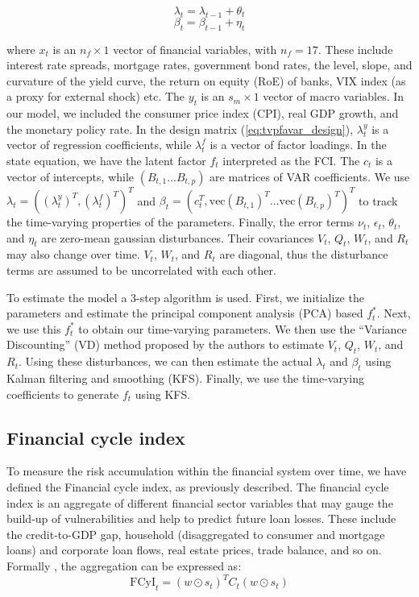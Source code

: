\documentclass[12pt,a4paper]{article}
\begin{document}
\begin{equation}
    \label{eq:tvpfavar_design_coeff}
    \lambda_t = \lambda_{t-1} + \theta_t
\end{equation}
\begin{equation}
    \label{eq:tvpfavar_transition_coeff}
    \beta_t = \beta_{t-1} + \eta_t
\end{equation}

where $x_t$ is an $n_f\times1$ vector of financial variables, with $n_f=17$. These include interest rate spreads, mortgage rates, government bond rates, the level, slope, and curvature of the yield curve, the return on equity (RoE) of banks, VIX index (as a proxy for external shock) etc. The $y_t$ is an $s_m\times1$ vector of macro variables. In our model, we included the consumer price index (CPI), real GDP growth, and the monetary policy rate. In the design matrix (\autoref{eq:tvpfavar_design}), $\lambda_t^y$ is a vector of regression coefficients, while $\lambda_t^f$ is a vector of factor loadings. In the state equation, we have the latent factor $f_t$ interpreted as the FCI. The $c_t$ is a vector of intercepts, while $(B_{t,1} \dots B_{t,p})$ are matrices of VAR coefficients. We use $\lambda_t=\left((\lambda_t^y)^T,(\lambda_t^f)^T \right)^T$ and $\beta_t=\left(c_t^T,\text{vec}(B_{t,1})^T \dots \text{vec}(B_{t,p})^T\right)^T$ to track the time-varying properties of the parameters. Finally, the error terms $\nu_t$, $\epsilon_t$, $\theta_t$, and $\eta_t$ are zero-mean gaussian disturbances. Their covariances $V_t$, $Q_t$, $W_t$, and $R_t$ may also change over time. $V_t$, $W_t$, and $R_t$ are diagonal, thus the disturbance terms are assumed to be uncorrelated with each other.

To estimate the model a 3-step algorithm is used. First, we initialize the parameters and estimate the principal component analysis (PCA) based $f_t^*$. Next, we use this $f_t^*$ to obtain our time-varying parameters. We then use the ``Variance Discounting'' (VD) method proposed by the authors \citep{koop_2013} to estimate $V_t$, $Q_t$, $W_t$, and $R_t$. Using these disturbances, we can then estimate the actual $\lambda_t$ and $\beta_t$ using Kalman filtering and smoothing (KFS). Finally, we use the time-varying coefficients to generate $f_t$ using KFS.

\subsection{Financial cycle index}
To measure the risk accumulation within the financial system over time, we have defined the Financial cycle index, as previously described. The financial cycle index is an aggregate of different financial sector variables that may gauge the build-up of vulnerabilities and help to predict future loan losses. These include the credit-to-GDP gap, household (disaggregated to consumer and mortgage loans) and corporate loan flows, real estate prices, trade balance, and so on. Formally \citep{hollo2012}, the aggregation can be expressed as:
\begin{equation}
    \label{eq:fcyi}
    \text{FCyI}_t = (w\odot s_t)^T C_t (w\odot s_t)
\end{equation}
\end{document}
